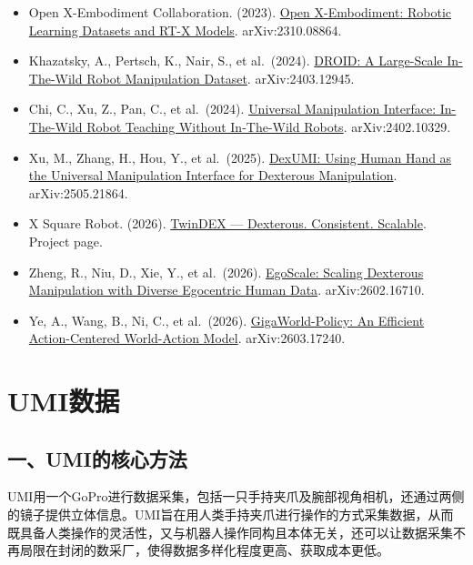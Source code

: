 \vspace{0.25em}
\begin{itemize}
\tightlist
\item
  Open X-Embodiment Collaboration. (2023). \href{https://arxiv.org/abs/2310.08864}{Open X-Embodiment: Robotic Learning Datasets and RT-X Models}. arXiv:2310.08864.
\item
  Khazatsky, A., Pertsch, K., Nair, S., et al.~(2024). \href{https://arxiv.org/abs/2403.12945}{DROID: A Large-Scale In-The-Wild Robot Manipulation Dataset}. arXiv:2403.12945.
\item
  Chi, C., Xu, Z., Pan, C., et al.~(2024). \href{https://arxiv.org/abs/2402.10329}{Universal Manipulation Interface: In-The-Wild Robot Teaching Without In-The-Wild Robots}. arXiv:2402.10329.
\item
  Xu, M., Zhang, H., Hou, Y., et al.~(2025). \href{https://arxiv.org/abs/2505.21864}{DexUMI: Using Human Hand as the Universal Manipulation Interface for Dexterous Manipulation}. arXiv:2505.21864.
\item
  X Square Robot. (2026). \href{https://x2robot.com/en/pages/twindex}{TwinDEX --- Dexterous. Consistent. Scalable}. Project page.
\item
  Zheng, R., Niu, D., Xie, Y., et al.~(2026). \href{https://arxiv.org/abs/2602.16710}{EgoScale: Scaling Dexterous Manipulation with Diverse Egocentric Human Data}. arXiv:2602.16710.
\item
  Ye, A., Wang, B., Ni, C., et al.~(2026). \href{https://arxiv.org/abs/2603.17240}{GigaWorld-Policy: An Efficient Action-Centered World-Action Model}. arXiv:2603.17240.
\end{itemize}

\clearpage

\hypertarget{umiux6570ux636e}{%
\section{UMI数据}\label{umiux6570ux636e}}

\hypertarget{ux4e00umiux7684ux6838ux5fc3ux65b9ux6cd5}{%
\subsection{一、UMI的核心方法}\label{ux4e00umiux7684ux6838ux5fc3ux65b9ux6cd5}}

UMI用一个GoPro进行数据采集，包括一只手持夹爪及腕部视角相机，还通过两侧的镜子提供立体信息。UMI旨在用人类手持夹爪进行操作的方式采集数据，从而既具备人类操作的灵活性，又与机器人操作同构且本体无关，还可以让数据采集不再局限在封闭的数采厂，使得数据多样化程度更高、获取成本更低。

